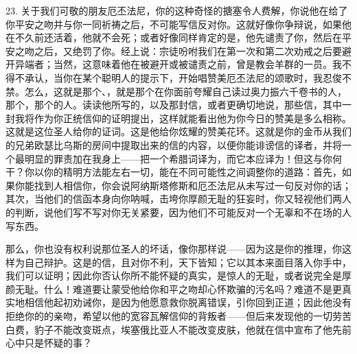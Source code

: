 23. 关于我们可敬的朋友厄丕法尼，你的这种奇怪的搪塞令人费解，你说他在给了你平安之吻并与你一同祈祷之后，不可能写信反对你。这就好像你争辩说，如果他在不久前还活着，他就不会死；或者好像同样肯定的是，他先谴责了你，然后在平安之吻之后，又绝罚了你。经上说：宗徒吩咐我们在第一次和第二次劝戒之后要避开异端者；当然，这意味着他在被避开或被谴责之前，曾是教会羊群的一员。我不得不承认，当你在某个聪明人的提示下，开始唱赞美厄丕法尼的颂歌时，我忍俊不禁。怎么，这就是那个、，就是那个在你面前夸耀自己读过奥力振六千卷书的人，那个，那个的人。读读他所写的，以及那封信，或者更确切地说，那些信，其中一封我将作为你正统信仰的证明提出，这样就能看出他为你今日的赞美是多么相称。这就是这位圣人给你的证词。这是他给你炫耀的赞美花环。这就是你的金币从我们的兄弟欧瑟比乌斯的房间中提取出来的信的内容，以便你能诽谤信的译者，并将一个最明显的罪责加在我身上——把一个希腊词译为，而它本应译为！但这与你何干？你以你的精明方法能左右一切，能在不同可能性之间调整你的道路：首先，如果你能找到人相信你，你会说阿纳斯塔修斯和厄丕法尼从未写过一句反对你的话；其次，当他们的信函本身向你呐喊，击垮你厚颜无耻的狂妄时，你又轻视他们两人的判断，说他们写不写对你无关紧要，因为他们不可能反对一个无辜和不在场的人写东西。\par

那么，你也没有权利说那位圣人的坏话，像你那样说——因为这是你的推理，你这样为自己辩护。这是的信，且对你不利，天下皆知；它以其本来面目落入你手中，我们可以证明；因此你否认你所不能怀疑的真实，是惊人的无耻，或者说完全是厚颜无耻。什么！难道要让蒙受他给你和平之吻却心怀欺骗的污名吗？难道不是更真实地相信他起初劝诫你，是因为他愿意救你脱离错误，引你回到正道；因此他没有拒绝你的的亲吻，希望以他的宽容瓦解信仰的背叛者——但后来发现他的一切劳苦白费，豹子不能改变斑点，埃塞俄比亚人不能改变皮肤，他就在信中宣布了他先前心中只是怀疑的事？\par


